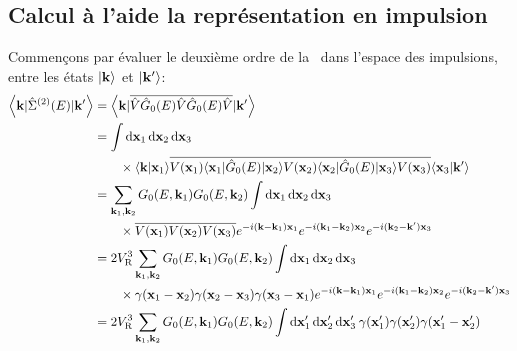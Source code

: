 \subsection{Calcul à l'aide la représentation en impulsion}
Commençons par évaluer le deuxième ordre de la \selfenergy\ dans l'espace des impulsions, entre les états $\left| \mathbf{k} \right\rangle$ et $\left| \mathbf{k}' \right\rangle$:
\begin{align}
\left\langle \mathbf{k} | \hat{\Sigma}^{(2)}(E) | \mathbf{k}' \right\rangle &= \left\langle \mathbf{k} | \overline{\hat{V} \hat{G}_0(E) \hat{V} \hat{G}_0(E) \hat{V}} | \mathbf{k}' \right\rangle \\
&=\int{\diff\mathbf{x}_{\mathrm{1}}\diff\mathbf{x}_{\mathrm{2}}\diff\mathbf{x}_{\mathrm{3}}\:}  \\
&\nonumber\qquad\times \langle\mathbf{k}|\mathbf{x}_{\mathrm{1}}\rangle \overline{V(\mathbf{x}_{\mathrm{1}}) \langle\mathbf{x}_{\mathrm{1}}|\hat{G}_0(E)|\mathbf{x}_{\mathrm{2}}\rangle V(\mathbf{x}_{\mathrm{2}}) \langle\mathbf{x}_{\mathrm{2}}|\hat{G}_0(E)|\mathbf{x}_{\mathrm{3}}\rangle V(\mathbf{x}_{\mathrm{3}})} \langle\mathbf{x}_{\mathrm{3}}|\mathbf{k}'\rangle \\
&= \sum_{\mathbf{k}_{\mathrm{1}},\mathbf{k}_{\mathrm{2}}}{ G_0(E,\mathbf{k}_{\mathrm{1}}) G_0(E,\mathbf{k}_{\mathrm{2}})} \int{\diff\mathbf{x}_{\mathrm{1}} \diff\mathbf{x}_{\mathrm{2}} \diff\mathbf{x}_{\mathrm{3}}} \\
&\nonumber\qquad\times \overline{V(\mathbf{x}_{\mathrm{1}})V(\mathbf{x}_{\mathrm{2}})V(\mathbf{x}_{\mathrm{3}})} e^{-i(\mathbf{k}-\mathbf{k}_{\mathrm{1}})\mathbf{x}_{\mathrm{1}}} e^{-i(\mathbf{k}_{\mathrm{1}}-\mathbf{k}_{\mathrm{2}})\mathbf{x}_{\mathrm{2}}} e^{-i(\mathbf{k}_{\mathrm{2}}-\mathbf{k}')\mathbf{x}_{\mathrm{3}}} \\
&=2 \VR^3 \sum_{\mathbf{k}_{\mathrm{1}},\mathbf{k}_{\mathrm{2}}}{ G_0(E,\mathbf{k}_{\mathrm{1}}) G_0(E,\mathbf{k}_{\mathrm{2}})} \int{\diff\mathbf{x}_{\mathrm{1}} \diff\mathbf{x}_{\mathrm{2}} \diff\mathbf{x}_{\mathrm{3}}} \\
&\nonumber\qquad\times \gamma(\mathbf{x}_{\mathrm{1}}-\mathbf{x}_{\mathrm{2}})\gamma(\mathbf{x}_{\mathrm{2}}-\mathbf{x}_{\mathrm{3}})\gamma(\mathbf{x}_{\mathrm{3}}-\mathbf{x}_{\mathrm{1}}) e^{-i(\mathbf{k}-\mathbf{k}_{\mathrm{1}})\mathbf{x}_{\mathrm{1}}} e^{-i(\mathbf{k}_{\mathrm{1}}-\mathbf{k}_{\mathrm{2}})\mathbf{x}_{\mathrm{2}}} e^{-i(\mathbf{k}_{\mathrm{2}}-\mathbf{k}')\mathbf{x}_{\mathrm{3}}} \\
&= 2 \VR^3 \sum_{\mathbf{k}_{\mathrm{1}},\mathbf{k}_{\mathrm{2}}}{G_0(E,\mathbf{k}_{\mathrm{1}}) G_0(E,\mathbf{k}_{\mathrm{2}})} \int{\diff\mathbf{x}_{\mathrm{1}}'\diff\mathbf{x}_{\mathrm{2}}'\diff\mathbf{x}_{\mathrm{3}}' \: \gamma(\mathbf{x}_{\mathrm{1}}')\gamma(\mathbf{x}_{\mathrm{2}}')\gamma(\mathbf{x}_{\mathrm{1}}'-\mathbf{x}_{\mathrm{2}}')}\\

\end{align}
